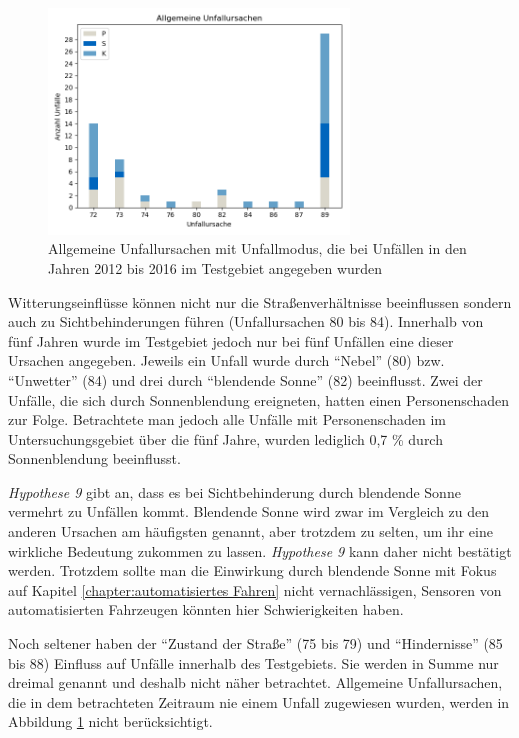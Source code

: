 \begin{savenotes}
	\begin{figure}[H]
		\centering
		\includegraphics[width=8cm,height=6cm]{figures/allg_Ursachen}
		\caption[Allgemeine Unfallursachen mit Unfallmodus, die bei Unfällen in den Jahren 2012 bis 2016 im Testgebiet angegeben wurden]{Allgemeine Unfallursachen mit Unfallmodus, die bei Unfällen in den Jahren 2012 bis 2016 im Testgebiet angegeben wurden}\label{fig:allg_Ursachen}
	\end{figure}
\end{savenotes}

Witterungseinflüsse können nicht nur die Straßenverhältnisse beeinflussen sondern auch zu Sichtbehinderungen führen (Unfallursachen 80 bis 84). Innerhalb von fünf Jahren wurde im Testgebiet jedoch nur bei fünf Unfällen eine dieser Ursachen angegeben. Jeweils ein Unfall wurde durch \enquote{Nebel} (80) bzw. \enquote{Unwetter} (84) und drei durch \enquote{blendende Sonne} (82) beeinflusst. Zwei der Unfälle, die sich durch Sonnenblendung ereigneten, hatten einen Personenschaden zur Folge. Betrachtete man jedoch alle Unfälle mit Personenschaden im Untersuchungsgebiet über die fünf Jahre, wurden lediglich 0,7 \% durch Sonnenblendung beeinflusst.

\textit{Hypothese 9} gibt an, dass es bei Sichtbehinderung durch blendende Sonne vermehrt zu Unfällen kommt. Blendende Sonne wird zwar im Vergleich zu den anderen Ursachen am häufigsten genannt, aber trotzdem zu selten, um ihr eine wirkliche Bedeutung zukommen zu lassen. \textit{Hypothese 9} kann daher nicht bestätigt werden. Trotzdem sollte man die Einwirkung durch blendende Sonne mit Fokus auf Kapitel \ref{chapter:automatisiertes Fahren} nicht vernachlässigen, Sensoren von automatisierten Fahrzeugen könnten hier Schwierigkeiten haben.
 
Noch seltener haben der \enquote{Zustand der Straße} (75 bis 79) und \enquote{Hindernisse} (85 bis 88) Einfluss auf Unfälle innerhalb des Testgebiets. Sie werden in Summe nur dreimal genannt und deshalb nicht näher betrachtet. Allgemeine Unfallursachen, die in dem betrachteten Zeitraum nie einem Unfall zugewiesen wurden, werden in Abbildung \ref{fig:allg_Ursachen} nicht berücksichtigt.

